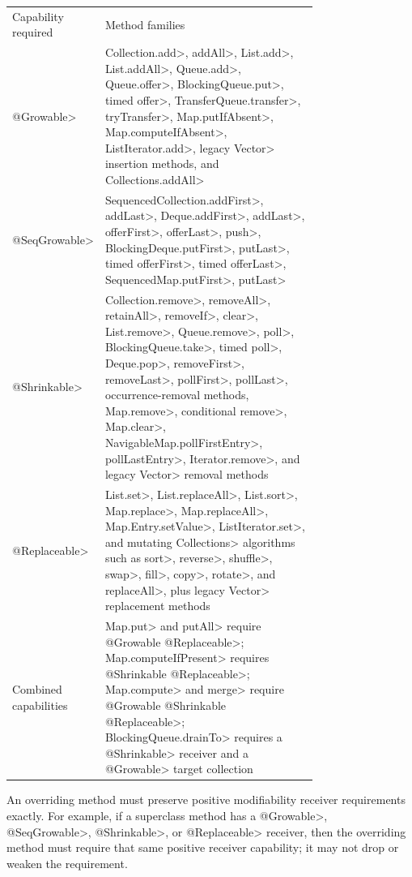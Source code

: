 \noindent
\begin{tabular}{lp{0.75\linewidth}}
Capability required & Method families \\
\<@Growable> &
  \<Collection.add>, \<addAll>, \<List.add>,
  \<List.addAll>, \<Queue.add>, \<Queue.offer>, \<BlockingQueue.put>,
  timed \<offer>, \<TransferQueue.transfer>, \<tryTransfer>,
  \<Map.putIfAbsent>, \<Map.computeIfAbsent>, \<ListIterator.add>,
  legacy \<Vector> insertion methods, and \<Collections.addAll> \\
\<@SeqGrowable> &
  \<SequencedCollection.addFirst>, \<addLast>, \<Deque.addFirst>,
  \<addLast>, \<offerFirst>, \<offerLast>, \<push>,
  \<BlockingDeque.putFirst>, \<putLast>, timed \<offerFirst>,
  timed \<offerLast>, \<SequencedMap.putFirst>, \<putLast> \\
\<@Shrinkable> &
  \<Collection.remove>, \<removeAll>, \<retainAll>,
  \<removeIf>, \<clear>, \<List.remove>, \<Queue.remove>, \<poll>,
  \<BlockingQueue.take>, timed \<poll>, \<Deque.pop>, \<removeFirst>,
  \<removeLast>, \<pollFirst>, \<pollLast>, occurrence-removal methods,
  \<Map.remove>, conditional \<remove>, \<Map.clear>,
  \<NavigableMap.pollFirstEntry>, \<pollLastEntry>, \<Iterator.remove>,
  and legacy \<Vector> removal methods \\
\<@Replaceable> &
  \<List.set>, \<List.replaceAll>,
  \<List.sort>, \<Map.replace>, \<Map.replaceAll>,
  \<Map.Entry.setValue>, \<ListIterator.set>, and mutating
  \<Collections> algorithms such as \<sort>, \<reverse>, \<shuffle>,
  \<swap>, \<fill>, \<copy>, \<rotate>, and \<replaceAll>, plus
  legacy \<Vector> replacement methods \\
Combined capabilities &
  \<Map.put> and \<putAll> require \<@Growable @Replaceable>;
  \<Map.computeIfPresent> requires \<@Shrinkable @Replaceable>;
  \<Map.compute> and \<merge> require
  \<@Growable @Shrinkable @Replaceable>;
  \<BlockingQueue.drainTo> requires a \<@Shrinkable> receiver and a
  \<@Growable> target collection \\
\end{tabular}

An overriding method must preserve positive modifiability receiver
requirements exactly.  For example, if a superclass method has a
\<@Growable>, \<@SeqGrowable>, \<@Shrinkable>, or \<@Replaceable> receiver,
then the overriding method must require that same positive receiver
capability; it may not drop or weaken the requirement.


